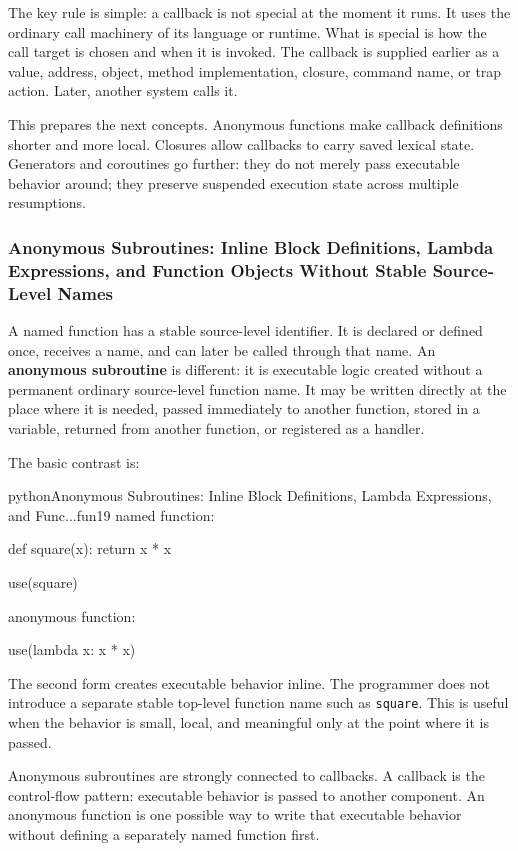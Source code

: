 The key rule is simple: a callback is not special at the moment it runs. It uses the ordinary call machinery of its language or runtime. What is special is how the call target is chosen and when it is invoked. The callback is supplied earlier as a value, address, object, method implementation, closure, command name, or trap action. Later, another system calls it.

This prepares the next concepts. Anonymous functions make callback definitions shorter and more local. Closures allow callbacks to carry saved lexical state. Generators and coroutines go further: they do not merely pass executable behavior around; they preserve suspended execution state across multiple resumptions.


\subsubsection{Anonymous Subroutines: Inline Block Definitions, Lambda Expressions, and Function Objects Without Stable Source-Level Names}

A named function has a stable source-level identifier. It is declared or defined once, receives a name, and can later be called through that name. An \textbf{anonymous subroutine} is different: it is executable logic created without a permanent ordinary source-level function name. It may be written directly at the place where it is needed, passed immediately to another function, stored in a variable, returned from another function, or registered as a handler.

The basic contrast is:

\begin{codebox}[]{python}{Anonymous Subroutines: Inline Block Definitions, Lambda Expressions, and Func...}{fun19}
named function:

def square(x):
    return x * x

use(square)


anonymous function:

use(lambda x: x * x)
\end{codebox}


The second form creates executable behavior inline. The programmer does not introduce a separate stable top-level function name such as \texttt{square}. This is useful when the behavior is small, local, and meaningful only at the point where it is passed.

Anonymous subroutines are strongly connected to callbacks. A callback is the control-flow pattern: executable behavior is passed to another component. An anonymous function is one possible way to write that executable behavior without defining a separately named function first.

